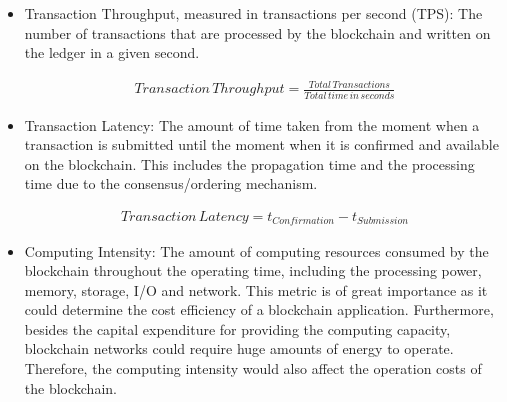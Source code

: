 \documentclass[conference]{IEEEtran}
\begin{document}
\begin{itemize}
    \item Transaction Throughput, measured in transactions per second (TPS):
    The number of transactions that are processed by the blockchain and written on the ledger in a given second.
    
    \begin{equation} \label{eq1}
    \begin{split}
    Transaction\,Throughput = \frac{Total\,Transactions}{Total\,time\,in\,seconds}
    \end{split}
    \end{equation}

    \item Transaction Latency:
    The amount of time taken from the moment when a transaction is submitted until the moment when it is confirmed and available on the blockchain. This includes the propagation time and the processing time due to the consensus/ordering mechanism.
    
    \begin{equation} \label{eq2}
    \begin{split}
    Transaction\,Latency = t_{Confirmation} - t_{Submission}
    \end{split}
    \end{equation}


    \item Computing Intensity:
    The amount of computing resources consumed by the blockchain throughout the operating time, including the processing power, memory, storage, I/O and network. This metric is of great importance as it could determine the cost efficiency of a blockchain application. Furthermore, besides the capital expenditure for providing the computing capacity, blockchain networks could require huge amounts of energy to operate. Therefore, the computing intensity would also affect the operation costs of the blockchain.
    

\end{itemize}
\end{document}
